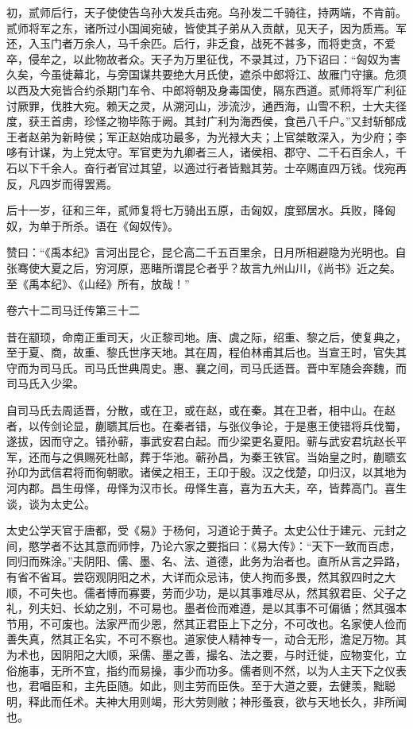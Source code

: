 \documentclass[12pt,UTF8]{ctexbook}
\begin{document}
初，贰师后行，天子使使告乌孙大发兵击宛。乌孙发二千骑往，持两端，不肯前。贰师将军之东，诸所过小国闻宛破，皆使其子弟从入贡献，见天子，因为质焉。军还，入玉门者万余人，马千余匹。后行，非乏食，战死不甚多，而将吏贪，不爱卒，侵牟之，以此物故者众。天子为万里征伐，不录其过，乃下诏曰：“匈奴为害久矣，今虽徙幕北，与旁国谋共要绝大月氏使，遮杀中郎将江、故雁门守攘。危须以西及大宛皆合约杀期门车令、中郎将朝及身毒国使，隔东西道。贰师将军广利征讨厥罪，伐胜大宛。赖天之灵，从溯河山，涉流沙，通西海，山雪不积，士大夫径度，获王首虏，珍怪之物毕陈于阙。其封广利为海西侯，食邑八千户。”又封斩郁成王者赵弟为新畤侯；军正赵始成功最多，为光禄大夫；上官桀敢深入，为少府；李哆有计谋，为上党太守。军官吏为九卿者三人，诸侯相、郡守、二千石百余人，千石以下千余人。奋行者官过其望，以適过行者皆黜其劳。士卒赐直四万钱。伐宛再反，凡四岁而得罢焉。



后十一岁，征和三年，贰师复将七万骑出五原，击匈奴，度郅居水。兵败，降匈奴，为单于所杀。语在《匈奴传》。



赞曰：“《禹本纪》言河出昆仑，昆仑高二千五百里余，日月所相避隐为光明也。自张骞使大夏之后，穷河原，恶睹所谓昆仑者乎？故言九州山川，《尚书》近之矣。至《禹本纪》、《山经》所有，放哉！”





卷六十二司马迁传第三十二



昔在颛顼，命南正重司天，火正黎司地。唐、虞之际，绍重、黎之后，使复典之，至于夏、商，故重、黎氏世序天地。其在周，程伯林甫其后也。当宣王时，官失其守而为司马氏。司马氏世典周史。惠、襄之间，司马氏适晋。晋中军随会奔魏，而司马氏入少梁。



自司马氏去周适晋，分散，或在卫，或在赵，或在秦。其在卫者，相中山。在赵者，以传剑论显，蒯聩其后也。在秦者错，与张仪争论，于是惠王使错将兵伐蜀，遂拔，因而守之。错孙蕲，事武安君白起。而少梁更名夏阳。蕲与武安君坑赵长平军，还而与之俱赐死杜邮，葬于华池。蕲孙昌，为秦王铁官。当始皇之时，蒯聩玄孙卬为武信君将而徇朝歌。诸侯之相王，王卬于殷。汉之伐楚，卬归汉，以其地为河内郡。昌生毋怿，毋怿为汉市长。毋怿生喜，喜为五大夫，卒，皆葬高门。喜生谈，谈为太史公。



太史公学天官于唐都，受《易》于杨何，习道论于黄子。太史公仕于建元、元封之间，愍学者不达其意而师悖，乃论六家之要指曰：《易大传》：“天下一致而百虑，同归而殊涂。”夫阴阳、儒、墨、名、法、道德，此务为治者也。直所从言之异路，有省不省耳。尝窃观阴阳之术，大详而众忌讳，使人拘而多畏，然其叙四时之大顺，不可失也。儒者博而寡要，劳而少功，是以其事难尽从，然其叙君臣、父子之礼，列夫妇、长幼之别，不可易也。墨者俭而难遵，是以其事不可偏循；然其强本节用，不可废也。法家严而少恩，然其正君臣上下之分，不可改也。名家使人俭而善失真，然其正名实，不可不察也。道家使人精神专一，动合无形，澹足万物。其为术也，因阴阳之大顺，采儒、墨之善，撮名、法之要，与时迁徙，应物变化，立俗施事，无所不宜，指约而易操，事少而功多。儒者则不然，以为人主天下之仪表也，君唱臣和，主先臣随。如此，则主劳而臣佚。至于大道之要，去健羡，黜聪明，释此而任术。夫神大用则竭，形大劳则敝；神形蚤衰，欲与天地长久，非所闻也。
\end{document}

